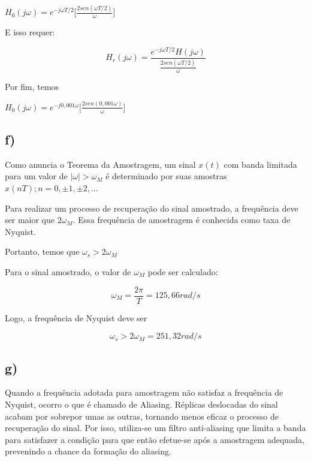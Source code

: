 \documentclass[a4paper,12pt,oneside,openany,table,xcdraw]{article}
\begin{document}
 \begin{center}
     $H_0(j\omega) = e^{-j\omega T/2}\bigg[\frac{2sen(\omega T/2)}{\omega}\bigg]$
 \end{center}

E isso requer:


 \begin{center}
     $$H_r(j\omega) = \frac{e^{-j\omega T/2}H(j\omega)}{\frac{2sen(\omega T/2)}{\omega}}$$
 \end{center}
Por fim, temos

\begin{center}
    $H_0(j\omega) = e^{-j0,001\omega}\bigg[\frac{2sen(0,001\omega)}{\omega}\bigg]$
    
\end{center}

\subsection{f)}

Como anuncia o Teorema da Amostragem, um sinal $x(t)$ com banda limitada para um valor de $|\omega| > \omega_M$ é determinado por suas amostras $x(nT); n = 0, \pm1, \pm2, ...$

Para realizar um processo de recuperação do sinal amostrado, a frequência deve ser maior que $2\omega_M$. Essa frequência de amostragem é conhecida como taxa de Nyquist.

Portanto, temos que $\omega_s > 2\omega_M$

Para o sinal amostrado, o valor de $\omega_M$ pode ser calculado:

\begin{center}
    $$\omega_M = \frac{2\pi}{T} = 125,66 rad/s$$
\end{center}

Logo, a frequência de Nyquist deve ser

\begin{center}
    $$\omega_s > 2\omega_M = 251,32 rad/s$$
\end{center}

\subsection{g)}
Quando a frequência adotada para amostragem não satisfaz a frequência de Nyquist, ocorro o que é chamado de Aliasing. Réplicas deslocadas do sinal acabam por sobrepor umas as outras, tornando menos eficaz o processo de recuperação do sinal. Por isso, utiliza-se um filtro anti-aliasing que limita a banda para satisfazer a condição para que então efetue-se após a amostragem adequada, prevenindo a chance da formação do aliasing.
\end{document}
